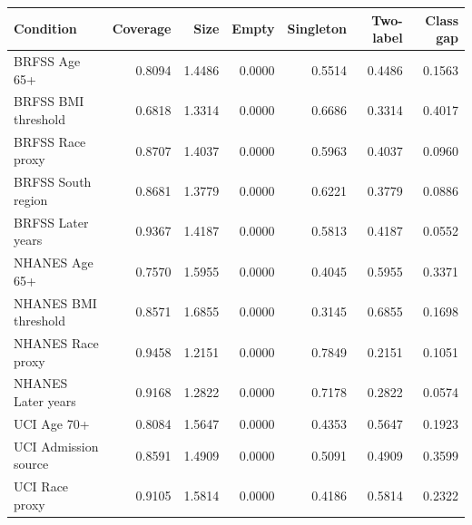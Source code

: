 \begin{tabular}{lrrrrrr}
\toprule
Condition & Coverage & Size & Empty & Singleton & Two-label & Class gap \\
\midrule
BRFSS Age 65+ & 0.8094 & 1.4486 & 0.0000 & 0.5514 & 0.4486 & 0.1563 \\
BRFSS BMI threshold & 0.6818 & 1.3314 & 0.0000 & 0.6686 & 0.3314 & 0.4017 \\
BRFSS Race proxy & 0.8707 & 1.4037 & 0.0000 & 0.5963 & 0.4037 & 0.0960 \\
BRFSS South region & 0.8681 & 1.3779 & 0.0000 & 0.6221 & 0.3779 & 0.0886 \\
BRFSS Later years & 0.9367 & 1.4187 & 0.0000 & 0.5813 & 0.4187 & 0.0552 \\
NHANES Age 65+ & 0.7570 & 1.5955 & 0.0000 & 0.4045 & 0.5955 & 0.3371 \\
NHANES BMI threshold & 0.8571 & 1.6855 & 0.0000 & 0.3145 & 0.6855 & 0.1698 \\
NHANES Race proxy & 0.9458 & 1.2151 & 0.0000 & 0.7849 & 0.2151 & 0.1051 \\
NHANES Later years & 0.9168 & 1.2822 & 0.0000 & 0.7178 & 0.2822 & 0.0574 \\
UCI Age 70+ & 0.8084 & 1.5647 & 0.0000 & 0.4353 & 0.5647 & 0.1923 \\
UCI Admission source & 0.8591 & 1.4909 & 0.0000 & 0.5091 & 0.4909 & 0.3599 \\
UCI Race proxy & 0.9105 & 1.5814 & 0.0000 & 0.4186 & 0.5814 & 0.2322 \\
\bottomrule
\end{tabular}
